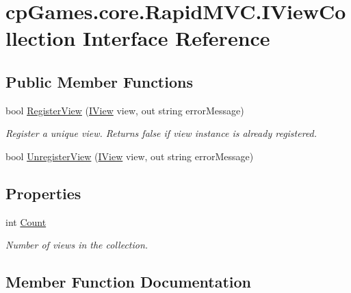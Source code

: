 \hypertarget{interfacecp_games_1_1core_1_1_rapid_m_v_c_1_1_i_view_collection}{}\section{cp\+Games.\+core.\+Rapid\+M\+V\+C.\+I\+View\+Collection Interface Reference}
\label{interfacecp_games_1_1core_1_1_rapid_m_v_c_1_1_i_view_collection}
\subsection*{Public Member Functions}
\begin{DoxyCompactItemize}
\item 
bool \mbox{\hyperlink{interfacecp_games_1_1core_1_1_rapid_m_v_c_1_1_i_view_collection_aba8465ad92ed63a4ad210c60d50cfc56}{Register\+View}} (\mbox{\hyperlink{interfacecp_games_1_1core_1_1_rapid_m_v_c_1_1_i_view}{I\+View}} view, out string error\+Message)
\begin{DoxyCompactList}\small\item\em Register a unique view. Returns false if view instance is already registered. \end{DoxyCompactList}\item 
bool \mbox{\hyperlink{interfacecp_games_1_1core_1_1_rapid_m_v_c_1_1_i_view_collection_acc10b801eec02af0165b9e558a915682}{Unregister\+View}} (\mbox{\hyperlink{interfacecp_games_1_1core_1_1_rapid_m_v_c_1_1_i_view}{I\+View}} view, out string error\+Message)
\end{DoxyCompactItemize}
\subsection*{Properties}
\begin{DoxyCompactItemize}
\item 
int \mbox{\hyperlink{interfacecp_games_1_1core_1_1_rapid_m_v_c_1_1_i_view_collection_a695e9747a76ed53cb845020e4171953a}{Count}}
\begin{DoxyCompactList}\small\item\em Number of views in the collection. \end{DoxyCompactList}\end{DoxyCompactItemize}


\subsection{Member Function Documentation}
\mbox{\label{interfacecp_games_1_1core_1_1_rapid_m_v_c_1_1_i_view_collection_aba8465ad92ed63a4ad210c60d50cfc56}} 
